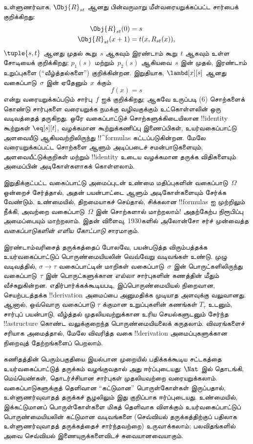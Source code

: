 \documentclass[../../../include/open-logic-section]{subfiles}
\begin{document}
உள்ளுணர்வாக, $\Obj{R}_{st}$ ஆனது பின்வருமாறு மீள்வரையறுக்கப்பட்ட
சார்பைக் குறிக்கிறது:
\begin{align*}
\Obj{R}_{st}(0) & = s \\
\Obj{R}_{st}(x+1) & = t(x, R_{st}(x)),
\end{align*}
$\tuple{s, t}$ ஆனது முதல் கூறு~$s$ ஆகவும் இரண்டாம் கூறு~$t$ ஆகவும்
உள்ள சோடியைக் குறிக்கிறது; $p_1(s)$ மற்றும்~$p_2(s)$ ஆகியவை~$s$ இன்
முதல், இரண்டாம் உறுப்புகளை (``வீழ்த்தல்களை'') குறிக்கின்றன. இறுதியாக,
$\lambd[x][s]$ ஆனது வகைப்பாடு~$\sigma$ இன் ஏதேனும்~$x$ க்கும்
\[
f(x) = s
\]
என்று வரையறுக்கப்படும் சார்பு~$f$ ஐக் குறிக்கிறது; ஆகவே உருப்படி (6)
சொற்களைக் கொண்டு சார்புகளை வரையறுக்க நமக்கு வழிவகுக்கும் உட்கொள்ளலின்
ஒரு வடிவத்தைத் தருகிறது. ஒரே வகைப்பாட்டுச் சொற்களுக்கிடையிலான
!!{identity} கூற்றுகள் $\eq[s][t]$, வழக்கமான கூற்றுக்கணிப்பு
இணைப்பிகள், உயர்வகைப்பாட்டு அளவையீடு ஆகியவற்றிலிருந்து
!!^{formula}s கட்டப்படுகின்றன. மேலே வரையறுக்கப்பட்ட சொற்களை ஆளும்
அடிப்படைச் சமன்பாடுகளையும், அளவையீட்டுக்குறிகள் மற்றும் !!{identity}
உடைய வழக்கமான தருக்க விதிகளையும் அமைப்பின் அடிகோள்களாகக் கொள்ளலாம்.

இறுதிக்குட்பட்ட வகைப்பாட்டு அமைப்புடன் உண்மை மதிப்புகளின்
வகைப்பாடு~$\Omega$ ஒன்றைச் சேர்த்தால், அதன் பயன்பாட்டை ஆளும்
அடிகோள்களையும் சேர்க்க வேண்டும். உண்மையில், திறமையாகச் செய்தால்,
சிக்கலான !!{formula}s ஐ முற்றிலும் நீக்கி, அவற்றை வகைப்பாடு~$\Omega$
இன் சொற்களால் மாற்றலாம்!{} அதற்கேற்ப நிரூபிப்பு அமைப்பையும் மாற்றலாம்.
இதன் விளைவு, 1930களில் அலோன்சோ சர்ச் முன்வைத்த
\emph{வகைப்பாடுகளின் எளிய கோட்பாடு} சாரமாகும்.

இரண்டாம்வரிசைத் தருக்கத்தைப் போலவே, பயன்படுத்த விரும்பத்தக்க
உயர்வகைப்பாட்டுப் பொருண்மையியலின் வெவ்வேறு வடிவங்கள் உண்டு. முழு
வடிவத்தில், $\sigma \to \tau$ வகைப்பாட்டின் மாறிகள்
வகைப்பாடு~$\sigma$ இன் பொருட்களிலிருந்து வகைப்பாடு~$\tau$ இன்
பொருட்களுக்கான \emph{எல்லா} சார்புகளின் கணத்தின் மீதும் வீச்சுறுகின்றன.
எதிர்பார்க்கக்கூடியபடி, இப்பொருண்மையியல் நிறைவான, செயற்படத்தக்க
!!{derivation} அமைப்பை அனுமதிக்க முடியாத அளவுக்கு வலுவானது. ஆனால்,
ஒவ்வொரு வகைப்பாடு $\tau$ க்குமான உறுப்புகளின் கணங்கள் $T_\tau$ உடனும்,
சார்புப் பயன்பாடு, வீழ்த்தல் முதலியவற்றுக்கான உரிய செயல்களுடனும் சேர்ந்த
!!a{structure} கொண்ட வலுக்குறைந்த பொருண்மையியலைக் கருதலாம். விவரங்களைச்
சரியாக அமைத்தால், மேலே விவரித்த வகை !!{derivation} அமைப்புகளுக்கான
நிறைவுத் தேற்றங்களைப் பெறலாம்.

கணிதத்தின் பெரும்பகுதியை இயல்பான முறையில் பதிக்கக்கூடிய சட்டகத்தை
உயர்வகைப்பாட்டுத் தருக்கம் வழங்குவதால் அது ஈர்ப்புடையது: $\Nat$ இல்
தொடங்கி, மெய்யெண்கள், தொடர்ச்சியான சார்புகள் முதலியவற்றை வரையறுக்கலாம்.
வகைப்பாடுகளுக்குத் தெளிவான ``கட்டுமான'' பொருள்கோள்கள் இருப்பதால்,
உள்ளுணர்வுவாதத் தருக்கச் சூழலிலும் இது குறிப்பாக ஈர்ப்புடையது.
உண்மையில், இக்கட்டுமானப் பொருள்கோள்களை மிகத் தெளிவாக விளக்கும்
உயர்வகைப்பாட்டுப் பொருண்மையியலின் கட்டுமான வடிவங்களை (செவ்வியல்
தருக்கத்திற்குப் பதிலாக உள்ளுணர்வுவாதத் தருக்கத்தைச் சார்ந்தவற்றை)
உருவாக்கலாம்; பலவிதங்களில் அவை செவ்வியல் இணையுருக்களைவிடச்
சுவையானவையாகும்.
\end{document}
